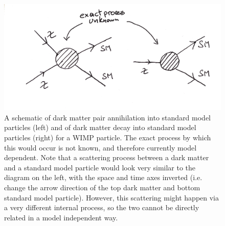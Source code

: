 \begin{figure}
    \centering
    \includegraphics[width=\textwidth]{figures/DM_processes.pdf}
    \caption{A schematic of dark matter pair annihilation into standard model particles (left) and of dark matter decay into standard model particles (right) for a WIMP particle. The exact process by which this would occur is not known, and therefore currently model dependent. Note that a scattering process between a dark matter and a standard model particle would look very similar to the diagram on the left, with the space and time axes inverted (i.e. change the arrow direction of the top dark matter and bottom standard model particle). However, this scattering might happen via a very different internal process, so the two cannot be directly related in a model independent way.}
    \label{fig:DM_ann_decay_processes}
\end{figure}
